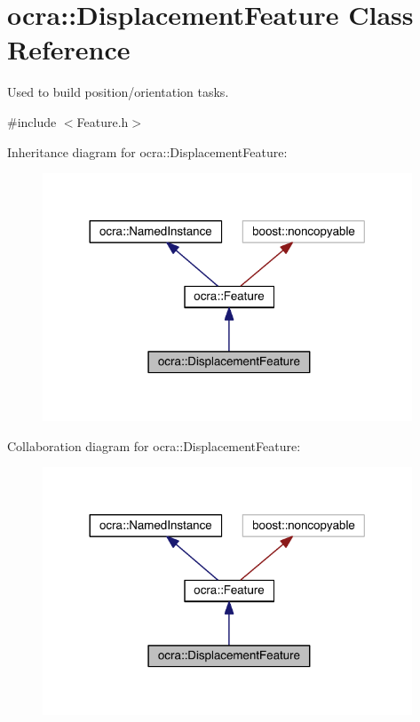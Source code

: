 \hypertarget{classocra_1_1DisplacementFeature}{}\section{ocra\+:\+:Displacement\+Feature Class Reference}
\label{classocra_1_1DisplacementFeature}


Used to build position/orientation tasks.  




{\ttfamily \#include $<$Feature.\+h$>$}



Inheritance diagram for ocra\+:\+:Displacement\+Feature\+:\nopagebreak
\begin{figure}[H]
\begin{center}
\leavevmode
\includegraphics[width=312pt]{d3/d4f/classocra_1_1DisplacementFeature__inherit__graph}
\end{center}
\end{figure}


Collaboration diagram for ocra\+:\+:Displacement\+Feature\+:\nopagebreak
\begin{figure}[H]
\begin{center}
\leavevmode
\includegraphics[width=312pt]{da/d53/classocra_1_1DisplacementFeature__coll__graph}
\end{center}
\end{figure}
